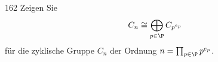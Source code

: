 \begin{algebraUE}{162}
Zeigen Sie
\begin{align*}
  C_n \cong \bigoplus_{p \in \P} C_{p^{e_p}}
\end{align*}
für die zyklische Gruppe $C_n$ der Ordnung $n = \prod_{p \in \P}p^{e_p}$.
\end{algebraUE}
\begin{solution}
\leavevmode \\

\end{solution}
